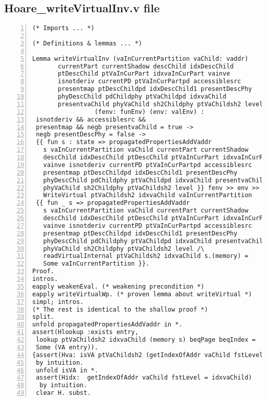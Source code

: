 \begin{appendices}
\section{Hoare\_writeVirtualInv.v file} \label{writeFile}
\begin{lstlisting}[xleftmargin=-.1\textwidth,
xrightmargin=-.1\textwidth,
mathescape=true,numbers=left]
(* Imports ... *)

(* Definitions & lemmas ... *)

Lemma writeVirtualInv (vaInCurrentPartition vaChild: vaddr)  
       currentPart currentShadow descChild idxDescChild 
       ptDescChild ptVaInCurPart idxvaInCurPart vainve 
       isnotderiv currentPD ptVaInCurPartpd accessiblesrc 
       presentmap ptDescChildpd idxDescChild1 presentDescPhy 
       phyDescChild pdChildphy ptVaChildpd idxvaChild 
       presentvaChild phyVaChild sh2Childphy ptVaChildsh2 level 
                 (fenv: funEnv) (env: valEnv) :
 isnotderiv && accessiblesrc && 
 presentmap && negb presentvaChild = true -> 
 negb presentDescPhy = false -> 
 {{ fun s : state => propagatedPropertiesAddVaddr 
   s vaInCurrentPartition vaChild currentPart currentShadow 
   descChild idxDescChild ptDescChild ptVaInCurPart idxvaInCurPart
   vainve isnotderiv currentPD ptVaInCurPartpd accessiblesrc 
   presentmap ptDescChildpd idxDescChild1 presentDescPhy 
   phyDescChild pdChildphy ptVaChildpd idxvaChild presentvaChild 
   phyVaChild sh2Childphy ptVaChildsh2 level }} fenv >> env >> 
   WriteVirtual ptVaChildsh2 idxvaChild vaInCurrentPartition 
 {{ fun _ s => propagatedPropertiesAddVaddr 
   s vaInCurrentPartition vaChild currentPart currentShadow 
   descChild idxDescChild ptDescChild ptVaInCurPart idxvaInCurPart
   vainve isnotderiv currentPD ptVaInCurPartpd accessiblesrc 
   presentmap ptDescChildpd idxDescChild1 presentDescPhy 
   phyDescChild pdChildphy ptVaChildpd idxvaChild presentvaChild 
   phyVaChild sh2Childphy ptVaChildsh2 level /\ 
   readVirtualInternal ptVaChildsh2 idxvaChild s.(memory) = 
   Some vaInCurrentPartition }}.
Proof.
intros.
eapply weakenEval. (* weakening precondition *)
eapply writeVirtualWp. (* proven lemma about writeVirtual *)
simpl; intros.
(* The rest is identical to the shallow proof *)
split. 
unfold propagatedPropertiesAddVaddr in *.
assert(Hlookup :exists entry, 
 lookup ptVaChildsh2 idxvaChild (memory s) beqPage beqIndex = 
 Some (VA entry)).
{assert(Hva: isVA ptVaChildsh2 (getIndexOfAddr vaChild fstLevel) s) 
 by intuition.
 unfold isVA in *.
 assert(Hidx:  getIndexOfAddr vaChild fstLevel = idxvaChild) 
  by intuition.
 clear H. subst. 

\end{lstlisting}
\end{appendices}
